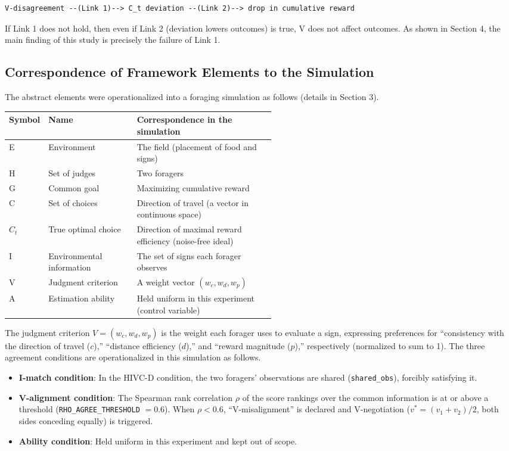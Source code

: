 \documentclass[11pt]{article}
\newcommand{\Ct}{\ensuremath{C_t}}
\begin{document}
\begin{Verbatim}[frame=single,fontsize=\small]
V-disagreement --(Link 1)--> C_t deviation --(Link 2)--> drop in cumulative reward
\end{Verbatim}

If Link 1 does not hold, then even if Link 2 (deviation lowers outcomes) is true, V does not affect outcomes. As shown in Section 4, the main finding of this study is precisely the failure of Link 1.

\subsection{Correspondence of Framework Elements to the Simulation}

The abstract elements were operationalized into a foraging simulation as follows (details in Section 3).

\begin{longtable}{@{}l l p{0.52\linewidth}@{}}
\toprule
Symbol & Name & Correspondence in the simulation \\
\midrule
E    & Environment & The field (placement of food and signs) \\
H    & Set of judges & Two foragers \\
G    & Common goal & Maximizing cumulative reward \\
C    & Set of choices & Direction of travel (a vector in continuous space) \\
\Ct{} & True optimal choice & Direction of maximal reward efficiency (noise-free ideal) \\
I    & Environmental information & The set of signs each forager observes \\
V    & Judgment criterion & A weight vector $(w_c, w_d, w_p)$ \\
A    & Estimation ability & Held uniform in this experiment (control variable) \\
\bottomrule
\end{longtable}

The judgment criterion $V = (w_c, w_d, w_p)$ is the weight each forager uses to evaluate a sign, expressing preferences for ``consistency with the direction of travel ($c$),'' ``distance efficiency ($d$),'' and ``reward magnitude ($p$),'' respectively (normalized to sum to 1). The three agreement conditions are operationalized in this simulation as follows.

\begin{itemize}[nosep]
  \item \textbf{I-match condition}: In the HIVC-D condition, the two foragers' observations are shared (\texttt{shared\_obs}), forcibly satisfying it.
  \item \textbf{V-alignment condition}: The Spearman rank correlation $\rho$ of the score rankings over the common information is at or above a threshold (\texttt{RHO\_AGREE\_THRESHOLD} $= 0.6$). When $\rho < 0.6$, ``V-misalignment'' is declared and V-negotiation ($v^* = (v_1 + v_2)/2$, both sides conceding equally) is triggered.
  \item \textbf{Ability condition}: Held uniform in this experiment and kept out of scope.
\end{itemize}
\end{document}
